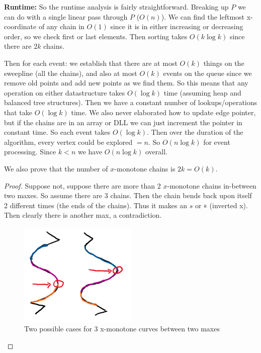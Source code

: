 \documentclass[11pt]{article}
\begin{document}
\textbf{Runtime:}
So the runtime analysis is fairly straightforward. Breaking up $P$ we can do with a single linear pass through $P$ ($O(n)$).
We can find the leftmost x-coordinate of any chain in $O(1)$ since it is in either increasing or decreasing order,
so we check first or last elements. Then sorting takes $O(k \log k)$ since there are $2k$ chains.

Then for each event: we establish that there are at most $O(k)$ things on the sweepline (all the chains),
and also at most $O(k)$ events on the queue since we remove old points and add new points as we find them.
So this means that any operation on either datastructure takes $O(\log k)$ time (assuming heap and balanced tree structures).
Then we have a constant number of lookups/operations that take $O(\log k)$ time. 
We also never elaborated how to update edge pointer, but if the chains are in an array or DLL we can just increment
the pointer in constant time. 
So each event takes $O(\log k)$.
Then over the duration of the algorithm, every vertex could be explored $=n$. So $O(n \log k)$ for event processing.
Since $k < n$ we have $O(n \log k)$ overall. 

We also prove that the number of $x$-monotone chains is $2k = O(k)$.
\begin{proof}
    Suppose not, suppose there are more than $2$ $x$-monotone chains in-between two maxes.
    So assume there are 3 chains. Then the chain bends back upon itself 2 different times (the ends of the chains).
    Thus it makes an $s$ or $\reflectbox{s}$ (inverted x). Then clearly there is another max, a contradiction.

    \begin{figure}[h]
        \centering
        \includegraphics[width = 0.5\textwidth]{s_curve.png}
        \caption{Two possible cases for 3 x-monotone curves between two maxes}
    \end{figure}

\end{proof}
\end{document}
